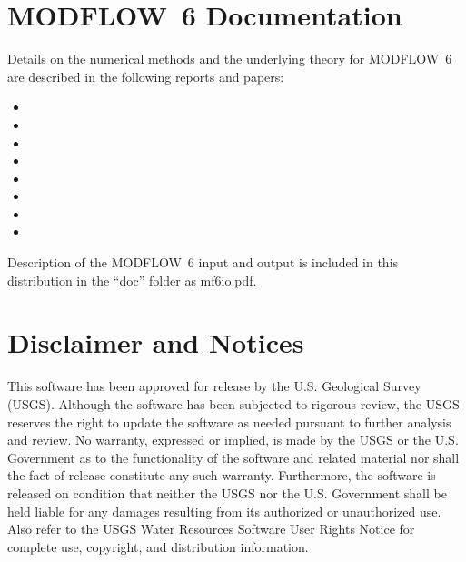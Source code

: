 \documentclass[11pt,twoside,twocolumn]{usgsreport}
\begin{document}
\section{MODFLOW~6 Documentation}
Details on the numerical methods and the underlying theory for MODFLOW~6 are described in the following reports and papers:

\begin{itemize}

\item {}

\item {}

\item {}

\item {}

\item {}

\item {}

\item {}

\item {}

\end{itemize}
 
\noindent Description of the MODFLOW~6 input and output is included in this distribution in the ``doc'' folder as mf6io.pdf.



\section{Disclaimer and Notices}

This software has been approved for release by the U.S. Geological Survey (USGS). Although the software has been subjected to rigorous review, the USGS reserves the right to update the software as needed pursuant to further analysis and review. No warranty, expressed or implied, is made by the USGS or the U.S. Government as to the functionality of the software and related material nor shall the fact of release constitute any such warranty. Furthermore, the software is released on condition that neither the USGS nor the U.S. Government shall be held liable for any damages resulting from its authorized or unauthorized use. Also refer to the USGS Water Resources Software User Rights Notice for complete use, copyright, and distribution information.
\end{document}
